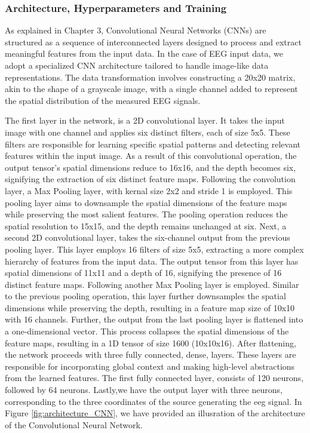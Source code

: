 \documentclass[a4paper, UKenglish, 11pt]{uiomaster}
\begin{document}
\subsubsection{Architecture, Hyperparameters and Training}

As explained in Chapter 3, Convolutional Neural Networks (CNNs) are structured as a sequence of interconnected layers designed to process and extract meaningful features from the input data. In the case of EEG input data, we adopt a specialized CNN architecture tailored to handle image-like data representations. The data transformation involves constructing a 20x20 matrix, akin to the shape of a grayscale image, with a single channel added to represent the spatial distribution of the measured EEG signals.

The first layer in the network, is a 2D convolutional layer. It takes the input image with one channel and applies six distinct filters, each of size 5x5. These filters are responsible for learning specific spatial patterns and detecting relevant features within the input image. As a result of this convolutional operation, the output tensor's spatial dimensions reduce to 16x16, and the depth becomes six, signifying the extraction of six distinct feature maps. Following the convolution layer, a Max Pooling layer, with kernal size 2x2 and stride 1 is employed. This pooling layer aims to downsample the spatial dimensions of the feature maps while preserving the most salient features. The pooling operation reduces the spatial resolution to 15x15, and the depth remains unchanged at six. Next, a second 2D convolutional layer, takes the six-channel output from the previous pooling layer. This layer employs 16 filters of size 5x5, extracting a more complex hierarchy of features from the input data. The output tensor from this layer has spatial dimensions of 11x11 and a depth of 16, signifying the presence of 16 distinct feature maps. Following another Max Pooling layer is employed. Similar to the previous pooling operation, this layer further downsamples the spatial dimensions while preserving the depth, resulting in a feature map size of 10x10 with 16 channels. Further, the output from the last pooling layer is flattened into a one-dimensional vector. This process collapses the spatial dimensions of the feature maps, resulting in a 1D tensor of size 1600 (10x10x16). After flattening, the network proceeds with three fully connected, dense, layers. These layers are responsible for incorporating global context and making high-level abstractions from the learned features. The first fully connected layer, consists of 120 neurons, followed by 64 neurons. Lastly,we have the output layer with three neurons, corresponding to the three coordinates of the source generating the eeg signal. In Figure \ref{fig:architecture_CNN}, we have provided an illusration of the architecture of the Convolutional Neural Network.
\end{document}

